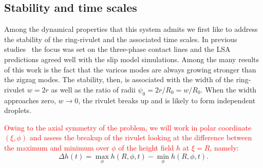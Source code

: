 \documentclass[twoside,twocolumn,9pt]{article}
\begin{document}
\subsection{Stability and time scales}\label{subsec:stability}
Among the dynamical properties that this system admits we first like to address the stability of the ring-rivulet and the associated time scales.
In previous studies~\cite{gonzalezStabilityLiquidRing2013} the focus was set on the three-phase contact lines and the LSA predictions agreed well with the slip model simulations.
Among the many results of this work is the fact that the varicos modes are always growing stronger than the zigzag modes.
The stability, then, is associated with the width of the ring-rivulet $w = 2r$ as well as the ratio of radii $\psi_0 = 2r/R_0 = w/R_0$.
When the width approaches zero, $w \rightarrow 0$, the rivulet breaks up and is likely to form independent droplets.

\textcolor{red}{Owing to the axial symmetry of the problem, we will 
work in polar coordinate $(\xi, \phi)$ and assess the breakup of the rivulet
looking at the difference between the maximum and minimum over $\phi$ of 
the height field $h$ at $\xi=R$, namely:}
\begin{equation}\label{eq:delta-h-measure}
       \Delta h(t) = \max_{\phi}h(R,\phi,t) - \min_{\phi}h(R,\phi,t).
\end{equation}
\end{document}
